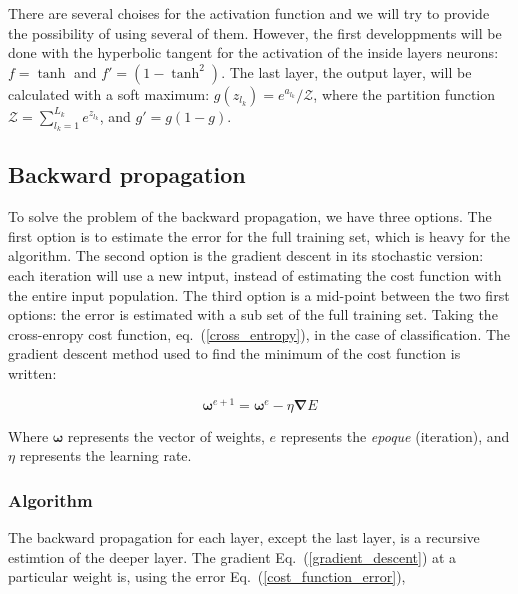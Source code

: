 \documentclass[final, paper=letter,5p,times,twocolumn]{elsarticle}
\begin{document}
  There are several choises for the activation function and we will try to provide the possibility of using several of them. However, the first developpments will be done with the hyperbolic tangent for the activation of the inside layers neurons: $f = \tanh$ and $f' = (1 - \tanh^{2})$. The last layer, the output layer, will be calculated with a soft maximum: $g(z_{l_{k}}) = e^{a_{l_{k}}} / \mathcal{Z}$, where the partition function $\mathcal{Z} = \sum_{l_{k} = 1}^{L_{k}} e^{z_{l_{k}}}$, and $g' = g(1 - g)$.
  
\subsection{Backward propagation}

To solve the problem of the backward propagation, we have three options. The first option is to estimate the error for the full training set, which is heavy for the algorithm. The second option is the gradient descent in its stochastic version: each iteration will use a new intput, instead of estimating the cost function with the entire input population. The third option is a mid-point between the two first options: the error is estimated with a sub set of the full training set.
Taking the cross-enropy cost function, eq.~(\ref{cross_entropy}), in the case of classification. The gradient descent method used to find the minimum of the cost function is written:

\begin{equation}
  \bm{\omega}^{e+1} = \bm{\omega}^{e} - \eta \bm{\nabla} E
  \label{gradient_descent}
\end{equation}

Where $\bm{\omega}$ represents the vector of weights, $e$ represents the {\it epoque} (iteration), and $\eta$ represents the learning rate. 


\subsubsection{Algorithm}

The backward propagation for each layer, except the last layer, is a recursive estimtion of the deeper layer. The gradient Eq.~(\ref{gradient_descent}) at a particular weight is, using the error Eq.~(\ref{cost_function_error}),
\end{document}
